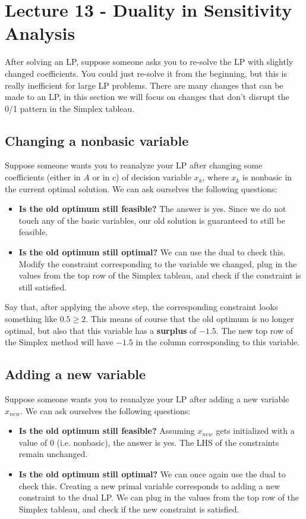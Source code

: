 \documentclass[12pt]{article}
\begin{document}
%
%
\newpage
\section*{Lecture 13 - Duality in Sensitivity Analysis}
After solving an LP, suppose someone asks you to re-solve the LP with slightly changed coefficients.
You could just re-solve it from the beginning, but this is really inefficient for large LP problems.
There are many changes that can be made to an LP, in this section we will focus on changes that don't disrupt the 0/1 pattern in the Simplex tableau.

\subsection*{Changing a nonbasic variable}
Suppose someone wants you to reanalyze your LP after changing some coefficients (either in $A$ or in $c$) of decision variable $x_k$, where $x_k$ is nonbasic in the current optimal solution.
We can ask ourselves the following questions:

\begin{itemize}
    \item \textbf{Is the old optimum still feasible?} The answer is yes. Since we do not touch any of the basic variables, our old solution is guaranteed to still be feasible.
    \item \textbf{Is the old optimum still optimal?} We can use the dual to check this. Modify the constraint corresponding to the variable we changed, plug in the values from the top row of the Simplex tableau, and check if the constraint is still satisfied.
\end{itemize}

\noindent
Say that, after applying the above step, the corresponding constraint looks something like $0.5 \geq 2$.
This means of course that the old optimum is no longer optimal, but also that this variable has a \textbf{surplus} of $-1.5$.
The new top row of the Simplex method will have $-1.5$ in the column corresponding to this variable.

\subsection*{Adding a new variable}
Suppose someone wants you to reanalyze your LP after adding a new variable $x_{new}$.
We can ask ourselves the following questions:

\begin{itemize}
    \item \textbf{Is the old optimum still feasible?} Assuming $x_{new}$ gets initialized with a value of 0 (i.e. nonbasic), the answer is yes. The LHS of the constraints remain unchanged.
    \item \textbf{Is the old optimum still optimal?} We can once again use the dual to check this. Creating a new primal variable corresponds to adding a new constraint to the dual LP. We can plug in the values from the top row of the Simplex tableau, and check if the new constraint is satisfied.
\end{itemize}
\end{document}
